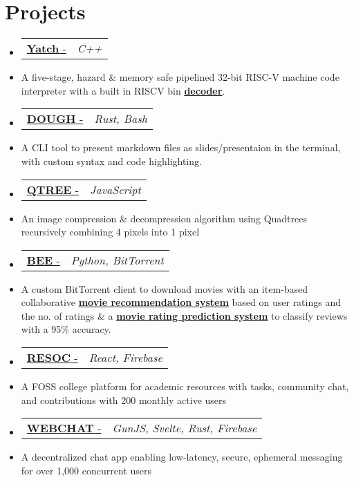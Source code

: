\documentclass[letterpaper,10pt]{article}
\makeatletter
\newcommand{\resumeItem}[1]{
  \item\small{
    {#1 \vspace{-2pt}}
  }
}
\newcommand{\resumeProjectHeading}[2]{
    \item
    \begin{tabular*}{0.97\textwidth}{l@{\extracolsep{\fill}}r}
      \small#1 & \textit{\small #2} \\
    \end{tabular*}\vspace{-4 pt}
}
\newcommand{\resumeSubItem}[1]{\resumeItem{#1}\vspace{-4pt}}
\newcommand{\resumeSubHeadingListStart}{\begin{itemize}[leftmargin=0.15in, label={}]}
\newcommand{\resumeSubHeadingListEnd}{\end{itemize}}
\makeatother
\begin{document}


\section{Projects}
  \resumeSubHeadingListStart
\resumeProjectHeading
  {\href{https://github.com/fuzzymf/yatch}{\textbf{Yatch} - \faIcon{link}}}{C++}
    \resumeSubItem
      {A five-stage, hazard \& memory safe pipelined 32-bit RISC-V machine code interpreter with a built in RISCV bin {\href{https://anubhavp.dev/barney}{\underline{\textbf{decoder}}}}.}
  \resumeProjectHeading
    {\href{https://github.com/fuzzymf/dough}{\textbf{DOUGH} - \faIcon{link}}}{Rust, Bash}
    \resumeSubItem
      {A CLI tool to present markdown files as slides/presentaion in the terminal, with custom syntax and code highlighting.}
  \resumeProjectHeading
    {\href{https://anubhavp.dev/blog/qtree.html}{\textbf{QTREE} - \faIcon{link}}}{JavaScript}
    \resumeSubItem
      {An image compression \& decompression algorithm using Quadtrees recursively combining 4 pixels into 1 pixel}
  \resumeProjectHeading
    {\href{https://github.com/fuzzymf/b}{{\textbf{BEE} - \faIcon{link} }}}{Python, BitTorrent}
    \resumeSubItem
      {A custom BitTorrent client to download movies with an item-based collaborative \href{https://github.com/fuzzymf/Movie-recommendation}{\underline{\textbf{ movie recommendation system}}} based on user ratings and the no. of ratings \& a \href{https://github.com/fuzzymf/Movie-rating-prediction}{\underline{\textbf{movie rating prediction system}}} to classify reviews with a 95\% accuracy.}
  \resumeProjectHeading
    {\href{https://github.com/fuzzymf/resoc}{\textbf{RESOC} - \faIcon{link} }}{React, Firebase}
    \resumeSubItem
      {A FOSS college platform for academic resources with tasks, community chat, and contributions with 200 monthly active users}
    \resumeProjectHeading
    {\href{https://github.com/fuzzymf/w3bchat-dapp}{\textbf{WEBCHAT} - \faIcon{link}}}{GunJS, Svelte, Rust, Firebase}
    \resumeSubItem
      {A decentralized chat app enabling low-latency, secure, ephemeral messaging for over 1,000 concurrent users}
  \resumeSubHeadingListEnd

%
\end{document}

